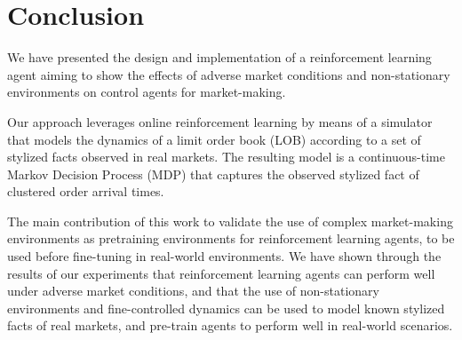 \section{Conclusion}
\label{sec:conclusion}

We have presented the design and implementation of a reinforcement learning agent aiming to show
the effects of adverse market conditions and non-stationary environments on control agents for market-making.

Our approach leverages online reinforcement learning by means of a simulator that models the dynamics of a limit order book (LOB)
according to a set of stylized facts observed in real markets.
The resulting model is a continuous-time Markov Decision Process (MDP) that captures the observed stylized fact of clustered order arrival times.

The main contribution of this work to validate the use of complex market-making environments as
pretraining environments for reinforcement learning agents, to be used before fine-tuning in real-world environments.
We have shown through the results of our experiments that reinforcement learning agents can
perform well under adverse market conditions, and that the use of non-stationary environments and fine-controlled dynamics
can be used to model known stylized facts of real markets, and pre-train agents to perform well in real-world scenarios.

